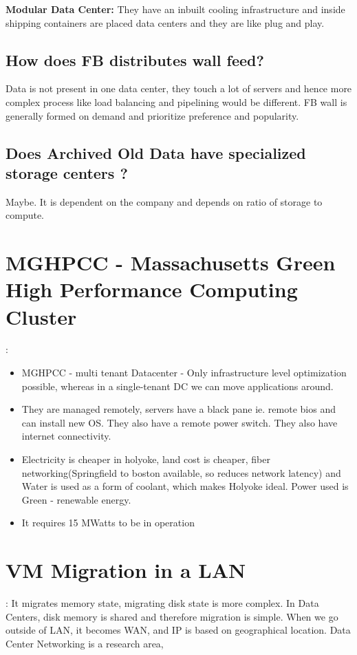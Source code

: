 \documentclass[twoside]{article}
\begin{document}
\textbf{Modular Data Center:} 
They have an inbuilt cooling infrastructure and inside shipping containers are placed data centers and they are like plug and play.

\subsection{How does FB distributes wall feed?}
Data is not present in one data center, they touch a lot of servers and hence more complex process like load balancing and pipelining would be different. FB wall is generally formed on demand and prioritize preference and popularity.

\subsection{Does Archived Old Data have specialized storage centers ?}

Maybe. It is dependent on the company and depends on ratio of storage to compute.


\section{MGHPCC - Massachusetts Green High Performance Computing Cluster}: 
\begin{itemize}
  \item MGHPCC - multi tenant Datacenter - Only infrastructure level optimization possible, whereas in a single-tenant DC we can move applications around.
  \item They are managed remotely, servers have a black pane ie. remote bios and can install new OS. They also have a remote power switch. They also have internet connectivity.
  \item Electricity is cheaper in holyoke, land cost is cheaper, fiber networking(Springfield to boston available, so reduces network latency) and Water is used as a form of coolant, which makes Holyoke ideal. Power used is Green - renewable energy.
  \item It requires 15 MWatts to be in operation
  
\end{itemize}

\section{VM Migration in a LAN}: 
It migrates memory state, migrating disk state is more complex. In Data Centers, disk memory is shared and therefore migration is simple. When we go outside of LAN, it becomes WAN, and IP is based on geographical location. 
Data Center Networking is a research area, 
\end{document}
